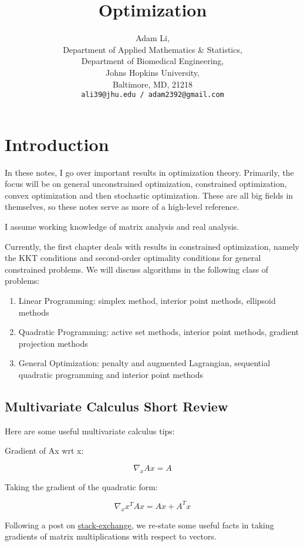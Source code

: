 \documentclass{article}
\title{Optimization}
\author{
  Adam Li, \\
  Department of Applied Mathematics \& Statistics, \\
  Department of Biomedical Engineering, \\
  Johns Hopkins University, \\
  Baltimore, MD, 21218 \\
  \texttt{ali39@jhu.edu / adam2392@gmail.com}
}
\theoremstyle{proposition}
\begin{document}
\maketitle

\tableofcontents

\section{Introduction}
	In these notes, I go over important results in optimization theory. Primarily, the focus will be on general unconstrained optimization, constrained optimization, convex optimization and then stochastic optimization. These are all big fields in themselves, so these notes serve as more of a high-level reference.

	I assume working knowledge of matrix analysis and real analysis.

  Currently, the first chapter deals with results in constrained optimization, namely the KKT conditions and second-order optimality conditions for general constrained problems. We will discuss algorithms in the following class of problems:

  \begin{enumerate}
    \item Linear Programming: simplex method, interior point methods, ellipsoid methods
    \item Quadratic Programming: active set methods, interior point methods, gradient projection methods
    \item General Optimization: penalty and augmented Lagrangian, sequential quadratic programming and interior point methods
  \end{enumerate}

  \subsection{Multivariate Calculus Short Review}
    Here are some useful multivariate calculus tips:

    Gradient of Ax wrt x: 

      $$\nabla_x Ax = A$$

    Taking the gradient of the quadratic form:

      $$\nabla_x x^T A x = Ax + A^T x$$

    Following a post on \href{https://math.stackexchange.com/questions/222894/how-to-take-the-gradient-of-the-quadratic-form?noredirect=1&lq=1}{stack-exchange}, we re-state some useful facts in taking gradients of matrix multiplications with respect to vectors.
\end{document}
